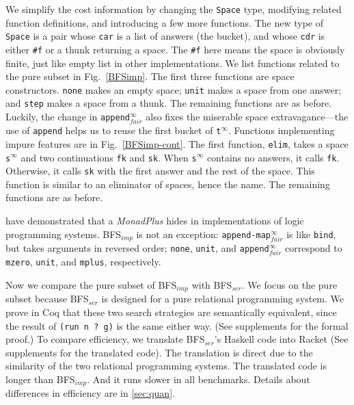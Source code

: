 \documentclass[acmlarge, review=true]{acmart}
\newcommand{\appendInfFair}{\texttt{append$^\infty_{fair}$}}
\newcommand{\appendMapInfFair}{\texttt{append-map$^\infty_{fair}$}}
\newcommand{\sInf}{\texttt{s$^\infty$}}
\newcommand{\tInf}{\texttt{t$^\infty$}}
\newcommand{\BFSser}[0]{BFS$_{ser}$}
\newcommand{\BFSimp}[0]{BFS$_{imp}$}
\begin{document}
We simplify the cost information by changing the \texttt{Space} type, 
modifying related function definitions, and introducing a few more functions.
The new type of \texttt{Space} is a pair whose \texttt{car} is a list of 
answers (the bucket), and whose \texttt{cdr} is either \texttt{\#{}f} or a 
thunk returning a space. The \texttt{\#{}f} here means the space is obviously 
finite, just like empty list in other implementations.
We list functions related to the pure subset in Fig.~\ref{BFSimp}. The first 
three functions are space constructors. \texttt{none} makes an empty space; 
\texttt{unit} makes a space from one answer; and \texttt{step} makes a space 
from a thunk. The remaining functions are as before. 
Luckily, the change in \appendInfFair{} also fixes the miserable space 
extravagance---the use of \texttt{append} helps us to reuse the first 
bucket of \tInf{}. 
Functions implementing impure features are in Fig.~\ref{BFSimp-cont}. The 
first function, \texttt{elim}, takes a space \sInf{} and two 
continuations \texttt{fk} and \texttt{sk}. When \sInf{} contains 
no answers, it calls \texttt{fk}. Otherwise, it calls 
\texttt{sk} with the first answer and the rest of the space. This function is 
similar to an eliminator of spaces, hence the name. The remaining 
functions are as before.

\citet{kiselyov2005backtracking} have demonstrated that a \emph{MonadPlus} 
hides in implementations of logic programming systems. \BFSimp{} is not an 
exception: \appendMapInfFair{} is like \texttt{bind}, but takes 
arguments in reversed order; \texttt{none}, \texttt{unit}, and 
\appendInfFair{} correspond to \texttt{mzero}, \texttt{unit}, and 
\texttt{mplus}, respectively.


Now we compare the pure subset of \BFSimp{} with \BFSser{}. We 
focus on the pure subset because \BFSser{} is designed for a pure 
relational programming system. We prove in Coq that these two search strategies 
are semantically equivalent, since the result of \texttt{(run n ? g)} is 
the same either way. (See supplements for the formal proof.) To 
compare efficiency, we translate \BFSser{}'s Haskell code into Racket (See 
supplements for the translated code). The translation is direct due to the 
similarity of the two relational programming systems. The translated code is 
longer than \BFSimp{}. And it runs slower in all benchmarks. Details about 
differences in efficiency are in \autoref{sec:quan}.
\end{document}

